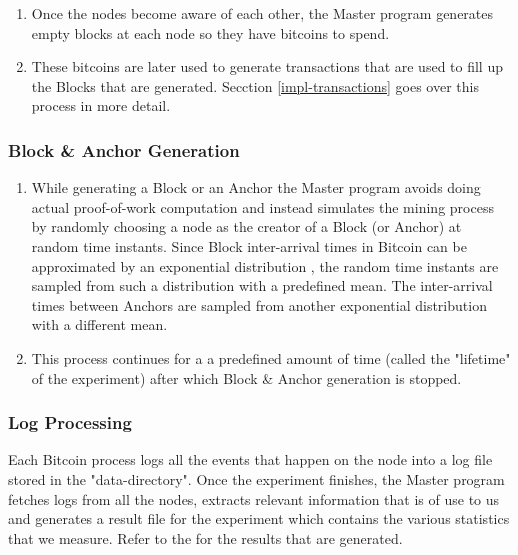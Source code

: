 
\begin{enumerate}
    \item Once the nodes become aware of each other, the Master program generates empty blocks at each node so they have bitcoins to spend.
    
    \item These bitcoins are later used to generate transactions that are used to fill up the Blocks that are generated.
          Secction \ref{impl-transactions} goes over this process in more detail.
\end{enumerate}

\subsubsection{Block \& Anchor Generation}

\begin{enumerate}
    \item While generating a Block or an Anchor the Master program avoids doing actual proof-of-work computation and instead simulates the mining process by randomly choosing a node as the creator of a Block (or Anchor) at random time instants.
    Since Block inter-arrival times in Bitcoin can be approximated by an exponential distribution \cite{bitcoinOriginal}, the random time instants are sampled from such a distribution with a predefined mean.
    The inter-arrival times between Anchors are sampled from another exponential distribution with a different mean.

    \item This process continues for a a predefined amount of time (called the "lifetime" of the experiment) after which Block \& Anchor generation is stopped.
\end{enumerate}

\subsubsection{Log Processing}

Each Bitcoin process logs all the events that happen on the node into a log file stored in the "data-directory".
Once the experiment finishes, the Master program fetches logs from all the nodes, extracts relevant information that is of use to us and generates a result file for the experiment which contains the various statistics that we measure. Refer to the  for the results that are generated.

